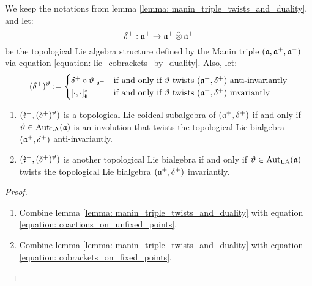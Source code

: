         \begin{theorem} \label{theorem: twisted_lie_bialgebraic_structures}
            We keep the notations from lemma \ref{lemma: manin_triple_twists_and_duality}, and let:
                $$\delta^+: \a^+ \to \a^+ \hattensor \a^+$$
            be the topological Lie algebra structure defined by the Manin triple $(\mathfrak{a}, \mathfrak{a}^+, \mathfrak{a}^-)$ via equation \eqref{equation: lie_cobrackets_by_duality}. Also, let:
                \begin{equation} \label{equation: twisted_lie_cobrackets}
                    (\delta^+)^{\vartheta} :=
                    \begin{cases}
                        \delta^+ \circ \vartheta|_{\mathfrak{a}^+} & \text{if and only if $\vartheta$ twists $(\mathfrak{a}^+, \delta^+)$ anti-invariantly}
                        \\
                        [\cdot, \cdot]_{\mathfrak{k}^-}^* & \text{if and only if $\vartheta$ twists $(\mathfrak{a}^+, \delta^+)$ invariantly}
                    \end{cases}
                \end{equation}
            \begin{enumerate}
                \item $(\mathfrak{k}^+, (\delta^+)^{\vartheta})$ is a topological Lie coideal subalgebra of $(\mathfrak{a}^+, \delta^+)$ if and only if $\vartheta \in \operatorname{Aut}_{\mathrm{LA}}(\mathfrak{a})$ is an involution that twists the topological Lie bialgebra $(\mathfrak{a}^+, \delta^+)$ anti-invariantly.
                \item $(\mathfrak{k}^+, (\delta^+)^{\vartheta})$ is another topological Lie bialgebra if and only if $\vartheta \in \operatorname{Aut}_{\mathrm{LA}}(\mathfrak{a})$ twists the topological Lie bialgebra $(\mathfrak{a}^+, \delta^+)$ invariantly.
            \end{enumerate}
        \end{theorem}
            \begin{proof}
                \begin{enumerate}
                    \item Combine lemma \ref{lemma: manin_triple_twists_and_duality} with equation \eqref{equation: coactions_on_unfixed_points}.
                    \item Combine lemma \ref{lemma: manin_triple_twists_and_duality} with equation \eqref{equation: cobrackets_on_fixed_points}.
                \end{enumerate}
            \end{proof}
            
